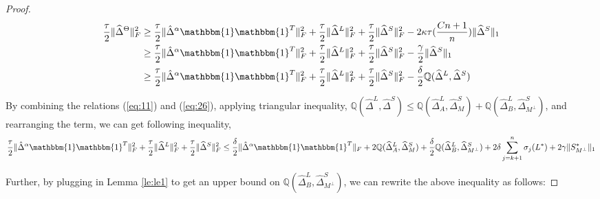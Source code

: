 \documentclass[AMS,STIX1COL]{WileyNJD-v2}
\begin{document}
\begin{proof}
\begin{align}
    \frac{\tau}{2}\|\widehat{\Delta}^{\Theta}\|_{F}^{2}  \nonumber
    &\geq \frac{\tau}{2} \|\hat{\Delta}^{\alpha}\mathbbm{1}\mathbbm{1}^T\|_{F}^{2} + \frac{\tau}{2} \|\widehat{\Delta}^{L}\|_{F}^{2} + \frac{\tau}{2} \|\widehat{\Delta}^{S}\|_{F}^{2}
    - 2\kappa\tau(\frac{Cn+1}{n})\|\widehat{\Delta}^{S}\|_{1} \\ \nonumber
    &\geq \frac{\tau}{2} \|\hat{\Delta}^{\alpha}\mathbbm{1}\mathbbm{1}^T\|_{F}^{2} + \frac{\tau}{2} \|\widehat{\Delta}^{L}\|_{F}^{2} + \frac{\tau}{2} \|\widehat{\Delta}^{S}\|_{F}^{2} - \frac{\gamma}{2}\|\widehat{\Delta}^{S}\|_{1}\\
    &\geq \frac{\tau}{2} \|\hat{\Delta}^{\alpha}\mathbbm{1}\mathbbm{1}^T\|_{F}^{2} + \frac{\tau}{2} \|\widehat{\Delta}^{L}\|_{F}^{2} + \frac{\tau}{2} \|\widehat{\Delta}^{S}\|_{F}^{2} - \frac{\delta}{2} \mathbb{Q}(\widehat{\Delta}^L,\widehat{\Delta}^S) \label{eq:26}
\end{align}

By combining the relations (\ref{eq:11}) and (\ref{eq:26}), applying triangular inequality, $\mathbb{Q}(\widehat{\Delta}^L,\widehat{\Delta}^S)\leq \mathbb{Q}(\widehat{\Delta}^L_{A},\widehat{\Delta}^S_{M}) + \mathbb{Q}(\widehat{\Delta}^L_{B},\widehat{\Delta}^S_{M^{\perp}})$, and rearranging the term, we can get following inequality,
\[
    \frac{\tau}{2} \|\hat{\Delta}^{\alpha}\mathbbm{1}\mathbbm{1}^T\|_{F}^{2} + \frac{\tau}{2} \|\widehat{\Delta}^{L}\|_{F}^{2} + \frac{\tau}{2} \|\widehat{\Delta}^{S}\|_{F}^{2} \\
    \leq \frac{\delta}{2} \|\hat{\Delta}^{\alpha}\mathbbm{1}\mathbbm{1}^T\|_{F} +
    2\mathbb{Q}(\widehat{\Delta}^L_{A},\widehat{\Delta}^S_{M}) +  \frac{\delta}{2} \mathbb{Q}(\widehat{\Delta}^L_{B},\widehat{\Delta}^S_{M^\perp}) +
    2 \delta \sum_{j=k+1}^{n} \sigma_{j}(L^{*}) + 2\gamma
    \|S^{*}_{M^\perp}\|_{1}
\]

Further, by plugging in Lemma \ref{le:le1} to get an upper bound on  $\mathbb{Q}(\widehat{\Delta}^L_{B},\widehat{\Delta}^S_{M^\perp})$, we can rewrite the above inequality as follows:


\end{proof}
\end{document}
